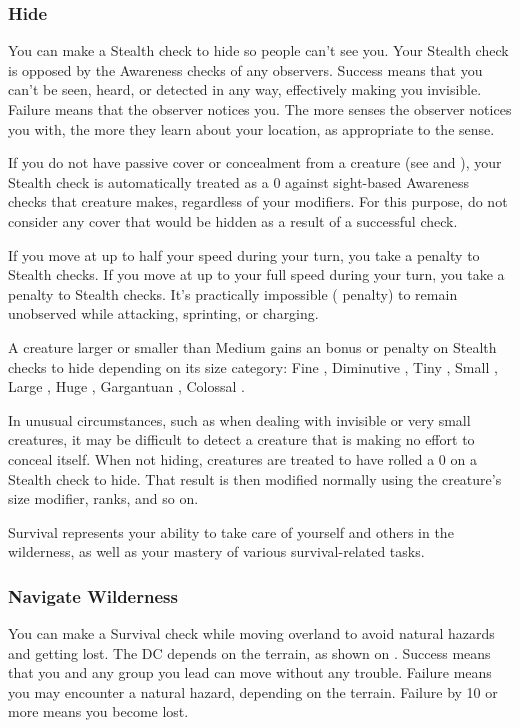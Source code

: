 \subsubsection{Hide}
You can make a Stealth check to hide so people can't see you. Your Stealth check is opposed by the Awareness checks of any observers. Success means that you can't be seen, heard, or detected in any way, effectively making you invisible. Failure means that the observer notices you. The more senses the observer notices you with, the more they learn about your location, as appropriate to the sense.

If you do not have passive cover or concealment from a creature (see  and ), your Stealth check is automatically treated as a 0 against sight-based Awareness checks that creature makes, regardless of your modifiers. For this purpose, do not consider any cover that would be hidden as a result of a successful check.

If you move at up to half your speed during your turn, you take a  penalty to Stealth checks. If you move at up to your full speed during your turn, you take a  penalty to Stealth checks. It's practically impossible ( penalty) to remain unobserved while attacking, sprinting, or charging.

A creature larger or smaller than Medium gains an bonus or penalty on Stealth checks to hide depending on its size category: Fine , Diminutive , Tiny , Small , Large , Huge , Gargantuan , Colossal .

 In unusual circumstances, such as when dealing with invisible or very small creatures, it may be difficult to detect a creature that is making no effort to conceal itself. When not hiding, creatures are treated to have rolled a 0 on a Stealth check to hide. That result is then modified normally using the creature's size modifier, ranks, and so on.

Survival represents your ability to take care of yourself and others in the wilderness, as well as your mastery of various survival-related tasks.

\subsubsection{Navigate Wilderness}
You can make a Survival check while moving overland to avoid natural hazards and getting lost. The DC depends on the terrain, as shown on . Success means that you and any group you lead can move without any trouble. Failure means you may encounter a natural hazard, depending on the terrain. Failure by 10 or more means you become lost.

